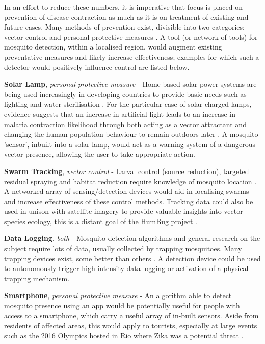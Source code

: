         In an effort to reduce these numbers, it is imperative that focus is placed on prevention of disease contraction as much as it is on treatment of existing and future cases. Many methods of prevention exist, divisible into two categories: vector control and personal protective measures \cite{Caraballo2014}. A tool (or network of tools) for mosquito detection, within a localised region, would augment existing preventative measures and likely increase effectiveness; examples for which such a detector would positively influence control are listed below.
        \begin{sitemize}
            \item{\textbf{Solar Lamp}, \textit{personal protective measure} - Home-based solar power systems are being used increasingly in developing countries to provide basic needs such as lighting and water sterilisation \cite{Akikur2013}. For the particular case of solar-charged lamps, evidence suggests that an increase in artificial light leads to an increase in malaria contraction likelihood through both acting as a vector attractant and changing the human population behaviour to remain outdoors later  \cite{Barghini2010}. A mosquito 'sensor', inbuilt into a solar lamp, would act as a warning system of a dangerous vector presence, allowing the user to take appropriate action.}
            \item{\textbf{Swarm Tracking}, \textit{vector control} - Larval control (source reduction), targeted residual spraying and habitat reduction require knowledge of mosquito location \cite{Caraballo2014,Pates2005,WHOVectorControl2016}. A networked array of sensing/detection devices would aid in localising swarms and increase effectiveness of these control methods. Tracking data could also be used in unison with satellite imagery to provide valuable insights into vector species ecology, this is a distant goal of the HumBug project \cite{HumBug2016}.}
            \item{\textbf{Data Logging}, \textit{both} - Mosquito detection algorithms and general research on the subject require lots of data, usually collected by trapping mosquitoes. Many trapping devices exist, some better than others \cite{Luhken2014}. A detection device could be used to autonomously trigger high-intensity data logging or activation of a physical trapping mechanism.}
            \item{\textbf{Smartphone}, \textit{personal protective measure} - An algorithm able to detect mosquito presence using an app would be potentially useful for people with access to a smartphone, which carry a useful array of in-built sensors. Aside from residents of affected areas, this would apply to tourists, especially at large events such as the 2016 Olympics hosted in Rio where Zika was a potential threat \cite{Petersen2016}.}

\end{sitemize}

